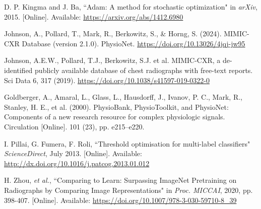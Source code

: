 \documentclass[12pt]{article}
\begin{document}
\begin{thebibliography}{99}
D. P. Kingma and J. Ba, ``Adam: A method for stochastic optimization" in \textit{arXiv}, 2015. [Online]. Available: \url{https://arxiv.org/abs/1412.6980}

Johnson, A., Pollard, T., Mark, R., Berkowitz, S., \& Horng, S. (2024). MIMIC-CXR Database (version 2.1.0). PhysioNet. \url{https://doi.org/10.13026/4jqj-jw95}

Johnson, A.E.W., Pollard, T.J., Berkowitz, S.J. et al. MIMIC-CXR, a de-identified publicly available database of chest radiographs with free-text reports. Sci Data 6, 317 (2019). \url{https://doi.org/10.1038/s41597-019-0322-0}

Goldberger, A., Amaral, L., Glass, L., Hausdorff, J., Ivanov, P. C., Mark, R., Stanley, H. E., et al. (2000). PhysioBank, PhysioToolkit, and PhysioNet: Components of a new research resource for complex physiologic signals. Circulation [Online]. 101 (23), pp. e215–e220.

I. Pillai, G. Fumera, F. Roli, ``Threshold optimisation for multi-label classifiers" \textit{ScienceDirect}, July 2013. [Online]. Available: \url{http://dx.doi.org/10.1016/j.patcog.2013.01.012}

H. Zhou, \textit{et al.}, ``Comparing to Learn: Surpassing ImageNet Pretraining on Radiographs by Comparing Image Representations" in \textit{Proc. MICCAI}, 2020, pp. 398-407. [Online]. Available: \url{https://doi.org/10.1007/978-3-030-59710-8_39}

\end{thebibliography}
\end{document}
